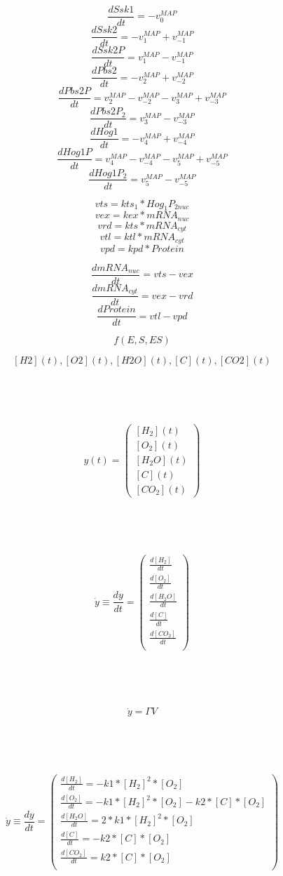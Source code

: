 \documentclass[11pt]{amsart}
\begin{document}
\[\frac{dSsk1}{dt} = -v_0^{MAP}\]
\[\frac{dSsk2}{dt} = -v_1^{MAP} + v_{-1}^{MAP} \]
\[\frac{dSsk2P}{dt} = v_1^{MAP} - v_{-1}^{MAP} \]
\[\frac{dPbs2}{dt} = -v_2^{MAP} + v_{-2}^{MAP}\]
\[\frac{dPbs2P}{dt} = v_2^{MAP} - v_{-2}^{MAP} - v_3^{MAP} + v_{-3}^{MAP}\]
\[\frac{dPbs2P_2}{dt} = v_3^{MAP} - v_{-3}^{MAP} \]
\[\frac{dHog1}{dt} = -v_4^{MAP} + v_{-4}^{MAP}\]
\[\frac{dHog1P}{dt} = v_4^{MAP} - v_{-4}^{MAP} - v_{5}^{MAP} + v_{-5}^{MAP} \]
\[\frac{dHog1P_2}{dt} =  v_{5}^{MAP} - v_{-5}^{MAP}\]

\clearpage

\[vts = kts_1*Hog_1P_{2nuc}\]
\[vex = kex*mRNA_{nuc}\]
\[vrd = kts*mRNA_{cyt}\]
\[vtl = ktl*mRNA_{cyt}\]
\[vpd = kpd*Protein\]


\[\frac{dmRNA_{nuc}}{dt} = vts - vex\]
\[\frac{dmRNA_{cyt}}{dt} = vex - vrd\]
\[\frac{dProtein}{dt} = vtl - vpd\]

\[f(E, S, ES)\]


\clearpage

\[[H2](t), [O2](t), [H2O](t), [C](t), [CO2](t)\]

\

\

\[
y(t) = 
\begin{pmatrix}
[H_2](t) \\
[O_2](t) \\
[H_2O](t) \\
[C](t) \\
[CO_2](t) 
\end{pmatrix}
 \]

\

\ 

 
\[{\dot  {y}}\equiv {\frac  {dy}{dt}}=\left({\begin{array}{c}{\frac  {d[H_2]}{dt}}\\[6pt]{\frac  {d[O_2]}{dt}}\\[6pt]{\frac  {d[H_2O]}{dt}}\\[6pt]{\frac  {d[C]}{dt}}\\[6pt]{\frac  {d[CO_2]}{dt}}\\[6pt] \end{array}}\right)\]

\

\

\[\dot{y} = \Gamma V\]

\

\


\[{\dot  {y}}\equiv {\frac  {dy}{dt}}=\left({\begin{array}{c}{\frac  {d[H_2]}{dt}=  -k1*[H_2]^2*[O_2]}\\[6pt]{\frac  {d[O_2]}{dt} = -k1*[H_2]^2*[O_2] - k2*[C]*[O_2]}\\[6pt]{\frac  {d[H_2O]}{dt} =  2*k1*[H_2]^2*[O_2]}\\[6pt]{\frac  {d[C]}{dt} =  - k2*[C]*[O_2]}\\[6pt]{\frac  {d[CO_2]}{dt} =  k2*[C]*[O_2]}\\[6pt] \end{array}}\right)\]
\end{document}
